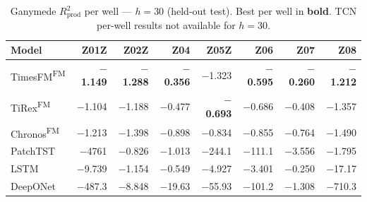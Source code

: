 \documentclass[11pt]{article}
\newcommand{\best}[1]{\textbf{#1}}
\newcommand{\fm}{\textsuperscript{FM}}
\newcommand{\rp}{R^2_\text{prod}}
\begin{document}
\begin{table}[ht]
\centering
\caption{Ganymede $\rp$ per well — $h{=}30$ (held-out test). Best per well in \textbf{bold}.
TCN per-well results not available for $h{=}30$.}
\label{tab:perwell_r2p_h30}
\scriptsize
\setlength{\tabcolsep}{2.5pt}
\begin{tabular}{@{}l rrrrrrr @{}}
\toprule
\textbf{Model} & \textbf{Z01Z} & \textbf{Z02Z} & \textbf{Z04} & \textbf{Z05Z} & \textbf{Z06} & \textbf{Z07} & \textbf{Z08} \\
\midrule
TimesFM\fm  & \best{$-$1.149} & \best{$-$1.288} & \best{$-$0.356} & $-$1.323 & \best{$-$0.595} & \best{$-$0.260} & \best{$-$1.212} \\
TiRex\fm    & $-$1.104 & $-$1.188 & $-$0.477 & \best{$-$0.693} & $-$0.686 & $-$0.408 & $-$1.357 \\
Chronos\fm  & $-$1.213 & $-$1.398 & $-$0.898 & $-$0.834 & $-$0.855 & $-$0.764 & $-$1.490 \\
PatchTST    & $-$4761 & $-$0.826 & $-$1.013 & $-$244.1 & $-$111.1 & $-$3.556 & $-$1.795 \\
LSTM        & $-$9.739 & $-$1.154 & $-$0.549 & $-$4.927 & $-$3.401 & $-$0.250 & $-$17.17 \\
DeepONet    & $-$487.3 & $-$8.848 & $-$19.63 & $-$55.93 & $-$101.2 & $-$1.308 & $-$710.3 \\
\bottomrule
\end{tabular}
\end{table}
\end{document}

